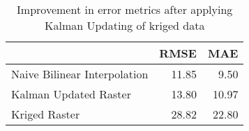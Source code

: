 \begin{table}
\centering
\caption{Improvement in error metrics after applying Kalman Updating of kriged data}
\label{tab:big_island_gebco_raster_error}
\begin{tabular}{lrr}
\toprule
 & RMSE & MAE \\
\midrule
Naive Bilinear Interpolation & 11.85 & 9.50 \\
Kalman Updated Raster & 13.80 & 10.97 \\
Kriged Raster & 28.82 & 22.80 \\
\bottomrule
\end{tabular}
\end{table}
